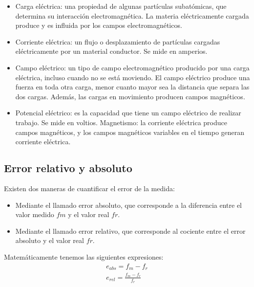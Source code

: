 \documentclass{article}
\begin{document}
\begin{itemize}
   

     \item Carga eléctrica: una propiedad de algunas partículas subatómicas, que determina su interacción electromagnética. La materia eléctricamente cargada produce y es influida por los campos electromagnéticos.\citep{Elec}
     
     \item Corriente eléctrica: un flujo o desplazamiento de partículas cargadas eléctricamente por un material conductor. Se mide en amperios.\citep{Elec}
     
     \item Campo eléctrico: un tipo de campo electromagnético producido por una carga eléctrica, incluso cuando no se está moviendo. El campo eléctrico produce una fuerza en toda otra carga, menor cuanto mayor sea la distancia que separa las dos cargas. Además, las cargas en movimiento producen campos magnéticos.\citep{Elec}
     
     \item Potencial eléctrico: es la capacidad que tiene un campo eléctrico de realizar trabajo. Se mide en voltios.
    Magnetismo: la corriente eléctrica produce campos magnéticos, y los campos magnéticos variables en el tiempo generan corriente eléctrica.\citep{Elec}

\end{itemize}

\subsection{Error relativo y absoluto}

Existen dos maneras de cuantificar el error de la medida:\citep{ErrorEx}

\begin{itemize}
    \item  Mediante el llamado error absoluto, que corresponde a la diferencia entre el valor medido $fm$ y el valor real $fr$.
    \item Mediante el llamado error relativo, que corresponde al cociente entre el error absoluto y el valor real $fr$.\citep{ErrorEx}
\end{itemize}

   

Matemáticamente tenemos las siguientes expresiones:\citep{ErrorEx}\\


\begin{eqnarray}
    e_{abs}= f_m − f_r\\
    e_{rel}= \frac{f_m − f_r}{f_r} 
\end{eqnarray}
    \citep{ErrorEx}
\end{document}
